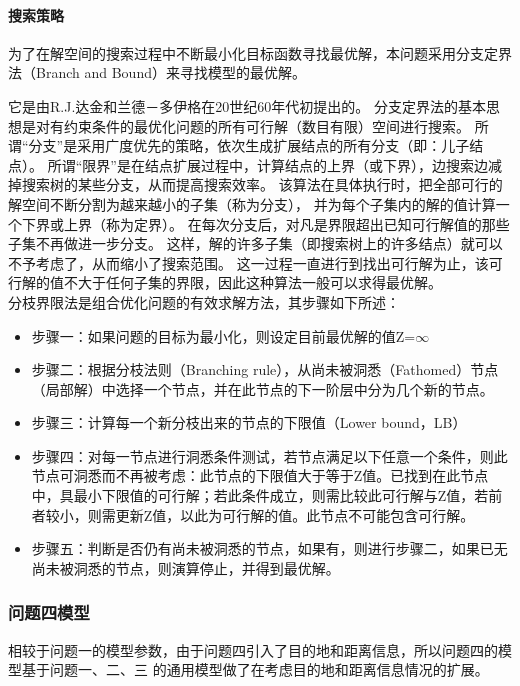 \documentclass[UTF8]{ctexart}
\begin{document}
\paragraph{搜索策略}
为了在解空间的搜索过程中不断最小化目标函数寻找最优解，本问题采用分支定界法（Branch and Bound）\cite{bbalgorithm}来寻找模型的最优解。

它是由R.J.达金和兰德－多伊格在20世纪60年代初提出的。
分支定界法的基本思想是对有约束条件的最优化问题的所有可行解（数目有限）空间进行搜索。
所谓“分支”是采用广度优先的策略，依次生成扩展结点的所有分支（即：儿子结点）。
所谓“限界”是在结点扩展过程中，计算结点的上界（或下界），边搜索边减掉搜索树的某些分支，从而提高搜索效率。
该算法在具体执行时，把全部可行的解空间不断分割为越来越小的子集（称为分支），
并为每个子集内的解的值计算一个下界或上界（称为定界）。
在每次分支后，对凡是界限超出已知可行解值的那些子集不再做进一步分支。
这样，解的许多子集（即搜索树上的许多结点）就可以不予考虑了，从而缩小了搜索范围。
这一过程一直进行到找出可行解为止，该可行解的值不大于任何子集的界限，因此这种算法一般可以求得最优解。\\

分枝界限法是组合优化问题的有效求解方法，其步骤如下所述：
\begin{itemize}
		\item 步骤一：如果问题的目标为最小化，则设定目前最优解的值Z=$\infty$
		\item 步骤二：根据分枝法则（Branching rule），从尚未被洞悉（Fathomed）节点（局部解）中选择一个节点，并在此节点的下一阶层中分为几个新的节点。
		\item 步骤三：计算每一个新分枝出来的节点的下限值（Lower bound，LB）
		\item  步骤四：对每一节点进行洞悉条件测试，若节点满足以下任意一个条件，则此节点可洞悉而不再被考虑：此节点的下限值大于等于Z值。已找到在此节点中，具最小下限值的可行解；若此条件成立，则需比较此可行解与Z值，若前者较小，则需更新Z值，以此为可行解的值。此节点不可能包含可行解。
		\item 步骤五：判断是否仍有尚未被洞悉的节点，如果有，则进行步骤二，如果已无尚未被洞悉的节点，则演算停止，并得到最优解。
\end{itemize}


\subsubsection{问题四模型}
	相较于问题一的模型参数，由于问题四引入了目的地和距离信息，所以问题四的模型基于问题一、二、三
	的通用模型做了在考虑目的地和距离信息情况的扩展。\\
	
\end{document}
